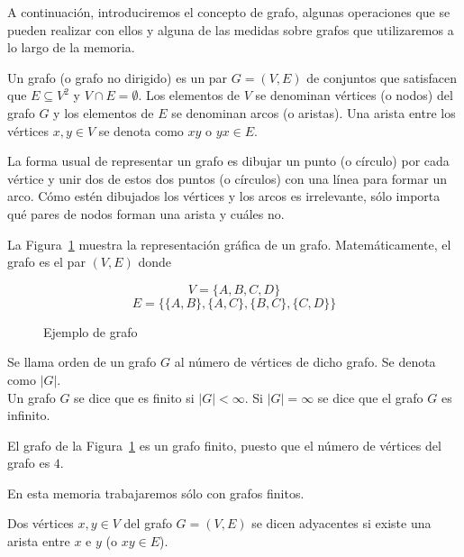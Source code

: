 A continuación, introduciremos el concepto de grafo, algunas operaciones que se pueden realizar con ellos y alguna de las medidas sobre grafos que utilizaremos a lo largo de la memoria.\\

\begin{defi}
	Un grafo (o grafo no dirigido) es un par $G = (V,E)$ de conjuntos que satisfacen que $E \subseteq V^2$ y $V \cap E = \emptyset$. Los elementos de $V$ se denominan vértices (o nodos) del grafo $G$ y los elementos de $E$ se denominan arcos (o aristas). Una arista entre los vértices $x, y \in V$ se denota como $xy$ o $yx \in E$.
\end{defi}

La forma usual de representar un grafo es dibujar un punto (o círculo) por cada vértice y unir dos de estos dos puntos (o círculos) con una línea para formar un arco. Cómo estén dibujados los vértices y los arcos es irrelevante, sólo importa qué pares de nodos forman una arista y cuáles no.

\begin{ejemplo}
	
	La Figura~\ref{fig:grafo} muestra la representación gráfica de un grafo. Matemáticamente, el grafo es el par $(V, E)$ donde
	
	\[ V = \{A, B, C, D\} \]
	\[ E = \{\{A,B\},\{A,C\},\{B,C\},\{C,D\} \} \]
	
	\begin{figure}[htb]
		\centering
		\ejemplografo
		\caption{Ejemplo de grafo}
		\label{fig:grafo}
	\end{figure}
	
\end{ejemplo}

\begin{defi}
	Se llama orden de un grafo $G$ al número de vértices de dicho grafo. Se denota como $|G|$.\\
	Un grafo $G$ se dice que es finito si $|G| < \infty$. Si $|G| = \infty$ se dice que el grafo $G$ es infinito.
\end{defi}

\begin{ejemplo}
	El grafo de la Figura~\ref{fig:grafo} es un grafo finito, puesto que el número de vértices del grafo es $4$.
\end{ejemplo}

En esta memoria trabajaremos sólo con grafos finitos.

\begin{defi}
	Dos vértices $x,y \in V$ del grafo $G = (V,E)$ se dicen adyacentes si existe una arista entre $x$ e $y$ (o $xy \in E$).
\end{defi}

